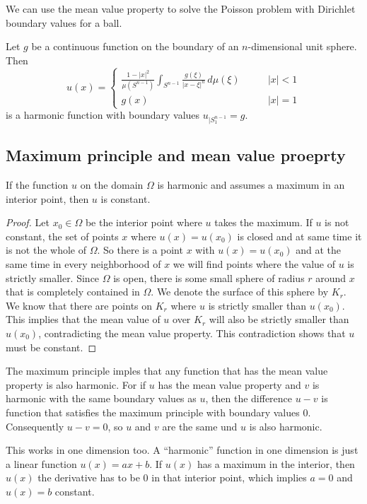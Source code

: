 We can use the mean value property to solve the Poisson problem with
Dirichlet boundary values for a ball.

\begin{satz}
Let $g$ be a continuous function on the boundary of an $n$-dimensional
unit sphere.
Then
\[
u(x)=\begin{cases}
\displaystyle \frac{1-|x|^2}{\mu(S^{n-1})}
\int_{S^{n-1}}\frac{g(\xi)}{|x-\xi|^n}\,d\mu(\xi)&\qquad |x|<1\\
g(x)&\qquad |x|=1
\end{cases}
\]
is a harmonic function with boundary values $u_{|S_1^{n-1}}=g$.
\end{satz}

\subsection{Maximum principle and mean value proeprty}
\begin{satz}
If the function $u$ on the domain
$\Omega$
is harmonic and assumes a maximum in an interior point,
then $u$ is constant.
\end{satz}

\begin{proof}
Let $x_0\in\Omega$ be the interior point where $u$ takes the maximum.
If $u$ is not constant, the set of points $x$ where $u(x)=u(x_0)$ is
closed and at same time it is not the whole of $\Omega$.
So there is a point $x$ with $u(x)=u(x_0)$ and at the same time
in every neighborhood of $x$ we will find points where the value of
$u$ is strictly smaller.
Since $\Omega$ is open, there is some small sphere of radius $r$
around $x$ that is completely contained in $\Omega$.
We denote the surface of this sphere by $K_r$.
We know that there are points on $K_r$ where $u$ is strictly smaller
than $u(x_0)$.
This implies that the mean value of $u$ over $K_r$ will also be
strictly smaller than $u(x_0)$, contradicting the mean value property.
This contradiction shows that $u$ must be constant.
\end{proof}

The maximum principle imples that any function that has the
mean value property is also harmonic.
For if $u$ has the mean value property and $v$ is harmonic with
the same boundary values as $u$, then the difference $u-v$ is 
function that satisfies the maximum principle with boundary
values $0$.
Consequently $u-v=0$, so $u$ and $v$ are the same und $u$ is also
harmonic.

This works in one dimension too.
A ``harmonic'' function in one dimension is just a linear function
$u(x)=ax+b$.
If $u(x)$ has a maximum in the interior, then $u(x)$ the derivative
has to be $0$ in that interior point, which implies $a=0$ and $u(x)=b$
constant.

